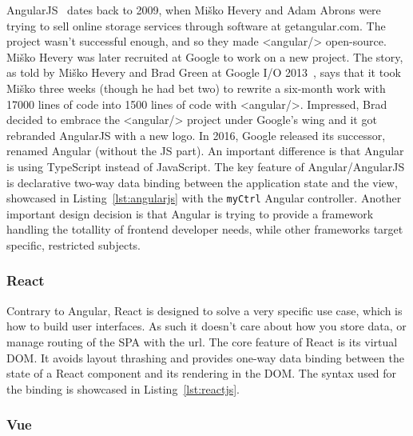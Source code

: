 AngularJS~\cite{hevery2009declarative} dates back to 2009, when Miško Hevery and Adam Abrons
were trying to sell online storage services through software at getangular.com.
The project wasn't successful enough, and so they made <angular/> open-source.
Miško Hevery was later recruited at Google to work on a new project.
The story, as told by Miško Hevery and Brad Green at Google I/O 2013~\cite{angularjs-googleio},
says that it took Miško three weeks (though he had bet two) to rewrite a six-month work
with 17000 lines of code into 1500 lines of code with <angular/>.
Impressed, Brad decided to embrace the <angular/> project under Google's wing
and it got rebranded AngularJS with a new logo.
In 2016, Google released its successor, renamed Angular (without the JS part).
An important difference is that Angular is using TypeScript instead of JavaScript.
The key feature of Angular/AngularJS is declarative two-way data binding
between the application state and the view,
showcased in Listing~\ref{lst:angularjs} with the \verb|myCtrl| Angular controller.
Another important design decision is that Angular is trying
to provide a framework handling the totallity of frontend developer needs,
while other frameworks target specific, restricted subjects.



\subsubsection{React}%
\label{ssub:react}

Contrary to Angular, React is designed to solve a very specific use case,
which is how to build user interfaces.
As such it doesn't care about how you store data,
or manage routing of the SPA with the url.
The core feature of React is its virtual DOM.
It avoids layout thrashing and provides one-way data binding
between the state of a React component
and its rendering in the DOM.\@
The syntax used for the binding is showcased in Listing~\ref{lst:reactjs}.




\subsubsection{Vue}%
\label{ssub:vue}


